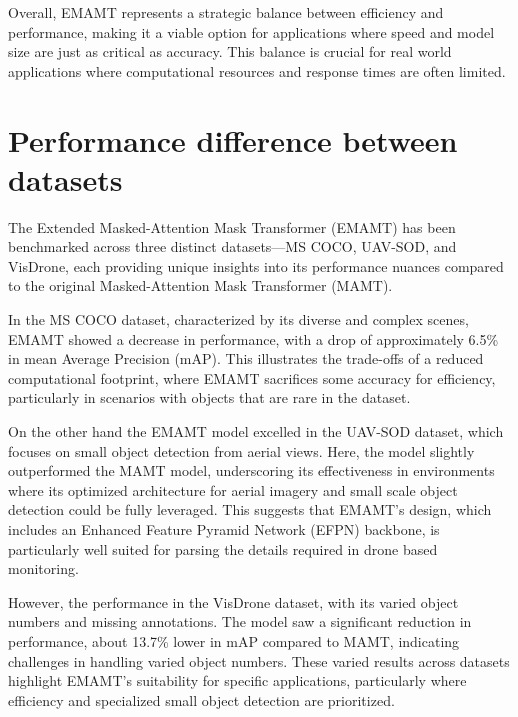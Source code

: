 Overall, EMAMT represents a strategic balance between efficiency and performance, making it a viable option for applications where speed and model size are 
just as critical as accuracy. This balance is crucial for real world applications where computational resources and response times are often limited.


\section{Performance difference between datasets}

The Extended Masked-Attention Mask Transformer (EMAMT) has been benchmarked across three distinct datasets—MS COCO, UAV-SOD, and VisDrone, each providing unique 
insights into its performance nuances compared to the original Masked-Attention Mask Transformer (MAMT).

In the MS COCO dataset, characterized by its diverse and complex scenes, EMAMT showed a decrease in performance, with a drop of approximately 6.5\% in 
mean Average Precision (mAP). This illustrates the trade-offs of a reduced computational footprint, where EMAMT sacrifices some accuracy for efficiency, 
particularly in scenarios with objects that are rare in the dataset.

On the other hand the EMAMT model excelled in the UAV-SOD dataset, which focuses on small object detection from aerial views. Here, the model slightly outperformed the MAMT model, 
underscoring its effectiveness in environments where its optimized architecture for aerial imagery and small scale object detection could be fully leveraged. 
This suggests that EMAMT’s design, which includes an Enhanced Feature Pyramid Network (EFPN) backbone, is particularly well suited for parsing the details required 
in drone based monitoring.

However, the performance in the VisDrone dataset, with its varied object numbers and missing annotations. The model saw a significant reduction 
in performance, about 13.7\% lower in mAP compared to MAMT, indicating challenges in handling varied object numbers. These varied results across datasets 
highlight EMAMT's suitability for specific applications, particularly where efficiency and specialized small object detection are prioritized.